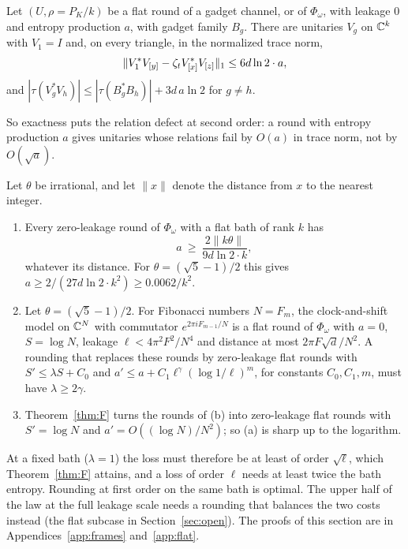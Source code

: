 \begin{lemma}\label{lem:L1}
Let $(U,\rho=P_K/k)$ be a flat round of a gadget channel, or of $\Phi_\omega$, with leakage $0$ and entropy production $a$, with gadget family
$B_g$. There are unitaries $V_g$ on $\mathbb C^k$ with $V_1=I$ and, on every triangle, in the normalized trace norm,
\[
\lVert V_1^*V_{[y]}-\zeta_tV_{[x]}^*V_{[z]}\rVert_1\le6d\ln2\cdot a,
\]
and $|\tau(V_g^*V_h)|\le|\tau(B_g^*B_h)|+3d\,a\ln2$ for $g\ne h$.
\end{lemma}

So exactness puts the relation defect at second order: a round with entropy production $a$ gives unitaries whose relations fail by $O(a)$ in
trace norm, not by $O(\sqrt a)$.

\begin{theorem}\label{thm:twisted}
Let $\theta$ be irrational, and let $\|x\|$ denote the distance from $x$ to the nearest integer.
\begin{enumerate}[label=(\alph*),itemsep=1pt]
\item Every zero-leakage round of $\Phi_\omega$ with a flat bath of rank $k$ has
\[
a\ \ge\ \frac{2\|k\theta\|}{9d\ln2\cdot k},
\]
whatever its distance. For $\theta=(\sqrt5-1)/2$ this gives $a\ge2/(27d\ln2\cdot k^2)\ge0.0062/k^2$.
\item Let $\theta=(\sqrt5-1)/2$. For Fibonacci numbers $N=F_m$, the clock-and-shift model on $\mathbb C^N$ with commutator $e^{2\pi iF_{m-1}/N}$ is a flat round
of $\Phi_\omega$ with $a=0$, $S=\log N$, leakage $\ell<4\pi^2F^2/N^4$ and distance at most $2\pi F\sqrt d/N^2$. A rounding that replaces these rounds by zero-leakage flat rounds with $S'\le\lambda S+C_0$ and $a'\le a+C_1\ell^\gamma(\log1/\ell)^m$, for constants
$C_0,C_1,m$, must have $\lambda\ge2\gamma$.
\item Theorem~\ref{thm:F} turns the rounds of (b) into zero-leakage flat rounds with $S'=\log N$ and $a'=O((\log N)/N^2)$; so (a) is sharp up to the
logarithm.
\end{enumerate}
\end{theorem}

At a fixed bath ($\lambda=1$) the loss must therefore be at least of order $\sqrt\ell$, which Theorem~\ref{thm:F} attains, and a loss of order
$\ell$ needs at least twice the bath entropy. Rounding at first order on the same bath is optimal. The upper half of the law at the full
leakage scale needs a rounding that balances the two costs instead (the flat subcase in Section~\ref{sec:open}). The proofs of this section are in
Appendices~\ref{app:frames} and~\ref{app:flat}.
